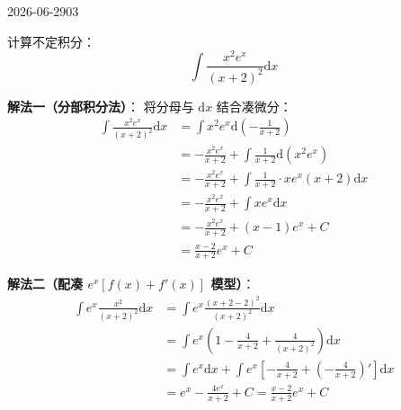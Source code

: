 \begin{mistake}{2026-06-29}{03}

\begin{problemcontent}
计算不定积分：
\[ \int \frac{x^2 e^x}{(x+2)^2} \mathrm{d}x \]
\end{problemcontent}

\begin{solutioncontent}
\textbf{解法一（分部积分法）}：
将分母与 $\mathrm{d}x$ 结合凑微分：
\[
\begin{aligned}
\int \frac{x^2 e^x}{(x+2)^2} \mathrm{d}x &= \int x^2 e^x \mathrm{d}\left(-\frac{1}{x+2}\right) \\
&= -\frac{x^2 e^x}{x+2} + \int \frac{1}{x+2} \mathrm{d}(x^2 e^x) \\
&= -\frac{x^2 e^x}{x+2} + \int \frac{1}{x+2} \cdot x e^x (x+2) \mathrm{d}x \\
&= -\frac{x^2 e^x}{x+2} + \int x e^x \mathrm{d}x \\
&= -\frac{x^2 e^x}{x+2} + (x-1)e^x + C \\
&= \frac{x-2}{x+2}e^x + C
\end{aligned}
\]

\textbf{解法二（配凑 $e^x[f(x)+f'(x)]$ 模型）}：
\[
\begin{aligned}
\int e^x \frac{x^2}{(x+2)^2} \mathrm{d}x &= \int e^x \frac{(x+2-2)^2}{(x+2)^2} \mathrm{d}x \\
&= \int e^x \left( 1 - \frac{4}{x+2} + \frac{4}{(x+2)^2} \right) \mathrm{d}x \\
&= \int e^x \mathrm{d}x + \int e^x \left[ -\frac{4}{x+2} + \left(-\frac{4}{x+2}\right)' \right] \mathrm{d}x \\
&= e^x - \frac{4e^x}{x+2} + C = \frac{x-2}{x+2}e^x + C
\end{aligned}
\]
\end{solutioncontent}


\end{mistake}
